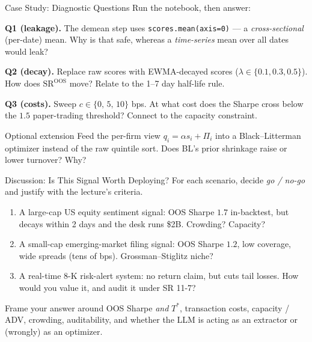 \documentclass[9pt,t]{beamer}
\begin{document}
\begin{frame}{Case Study: Diagnostic Questions}
Run the notebook, then answer:

\medskip
\textbf{Q1 (leakage).} The demean step uses \texttt{scores.mean(axis=0)} --- a
\emph{cross-sectional} (per-date) mean. Why is that safe, whereas a \emph{time-series}
mean over all dates would leak?

\medskip
\textbf{Q2 (decay).} Replace raw scores with EWMA-decayed scores
($\lambda\in\{0.1,0.3,0.5\}$). How does $\text{SR}^{\text{OOS}}$ move? Relate to the
1--7 day half-life rule.

\medskip
\textbf{Q3 (costs).} Sweep $c\in\{0,\,5,\,10\}$ bps. At what cost does the
Sharpe cross below the $1.5$ paper-trading threshold? Connect to the capacity constraint.

\medskip
\begin{block}{Optional extension}
Feed the per-firm view $q_i=\alpha s_i+\Pi_i$ into a Black--Litterman optimizer instead of
the raw quintile sort. Does BL's prior shrinkage raise or lower turnover? Why?
\end{block}
\end{frame}

\begin{frame}{Discussion: Is This Signal Worth Deploying?}
For each scenario, decide \emph{go / no-go} and justify with the lecture's criteria.

\medskip
\begin{enumerate}
  \item A large-cap US equity sentiment signal: OOS Sharpe $1.7$ in-backtest, but
        decays within 2 days and the desk runs \$2B. Crowding? Capacity?
  \item A small-cap emerging-market filing signal: OOS Sharpe $1.2$, low coverage,
        wide spreads (tens of bps). Grossman--Stiglitz niche?
  \item A real-time 8-K risk-alert system: no return claim, but cuts tail losses.
        How would you value it, and audit it under SR 11-7?
\end{enumerate}

\medskip
\begin{block}{Frame your answer around}
OOS Sharpe \emph{and} $T^*$, transaction costs, capacity / ADV, crowding,
auditability, and whether the LLM is acting as an extractor or (wrongly) as an optimizer.
\end{block}
\end{frame}
\end{document}
